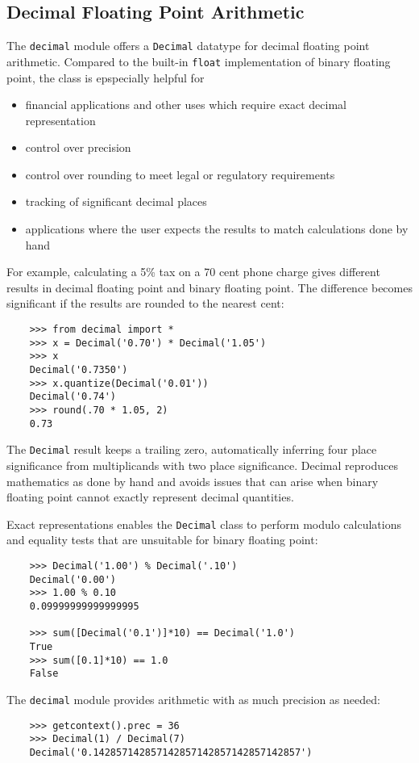 \documentclass[UTF8]{article}
\begin{document}
\subsection{Decimal Floating Point Arithmetic}
The \texttt{decimal} module offers a \texttt{Decimal} datatype for decimal floating point
arithmetic. Compared to the built-in \texttt{float} implementation of binary floating point, the
class is epspecially helpful for
\begin{itemize}
    \item financial applications and other uses which require exact decimal representation
    \item control over precision
    \item control over rounding to meet legal or regulatory requirements
    \item tracking of significant decimal places
    \item applications where the user expects the results to match calculations done by hand
\end{itemize}

For example, calculating a 5\% tax on a 70 cent phone charge gives different results in decimal
floating point and binary floating point. The difference becomes significant if the results are
rounded to the nearest cent:
\begin{verbatim}
    >>> from decimal import *
    >>> x = Decimal('0.70') * Decimal('1.05')
    >>> x
    Decimal('0.7350')
    >>> x.quantize(Decimal('0.01'))
    Decimal('0.74')
    >>> round(.70 * 1.05, 2)
    0.73
\end{verbatim}

The \texttt{Decimal} result keeps a trailing zero, automatically inferring four place significance
from multiplicands with two place significance. Decimal reproduces mathematics as done by hand and
avoids issues that can arise when binary floating point cannot exactly represent decimal
quantities.

Exact representations enables the \texttt{Decimal} class to perform modulo calculations and
equality tests that are unsuitable for binary floating point:
\begin{verbatim}
    >>> Decimal('1.00') % Decimal('.10')
    Decimal('0.00')
    >>> 1.00 % 0.10
    0.09999999999999995

    >>> sum([Decimal('0.1')]*10) == Decimal('1.0')
    True
    >>> sum([0.1]*10) == 1.0
    False
\end{verbatim}

The \texttt{decimal} module provides arithmetic with as much precision as needed:
\begin{verbatim}
    >>> getcontext().prec = 36
    >>> Decimal(1) / Decimal(7)
    Decimal('0.142857142857142857142857142857142857')
\end{verbatim}
\end{document}
